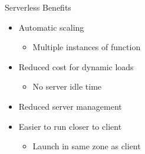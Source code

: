 \documentclass{slide}
\begin{document}
\begin{frame}{Serverless Benefits}
\vspace{1pt}
{\huge
\begin{itemize}
    \item<1-> Automatic scaling
    \begin{itemize}
        \LARGE\item Multiple instances of function
    \end{itemize}
    \vspace{2mm}
    \item<2-> Reduced cost for dynamic loads
    \begin{itemize}
        \LARGE\item No server idle time
    \end{itemize}
    \item<3-> Reduced server management
    \vspace{2mm}
    \item<4-> Easier to run closer to client
    \begin{itemize}
        \LARGE\item Launch in same zone as client 
    \end{itemize}
\end{itemize}
}
\end{frame}
\end{document}
